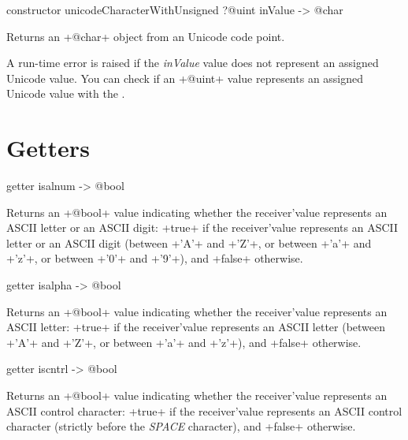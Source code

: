 
\begin{galgas}
constructor unicodeCharacterWithUnsigned ?@uint inValue -> @char
\end{galgas}


Returns an \ggs+@char+ object from an Unicode code point.

A run-time error is raised if the \emph{inValue} value does not represent an assigned Unicode value. You can check if an \ggs+@uint+ value represents an assigned Unicode value with the .


\section{Getters}



\begin{galgas}
getter isalnum -> @bool
\end{galgas}

Returns an \ggs+@bool+ value indicating whether the receiver'value represents an ASCII letter or an ASCII digit: \ggs+true+ if the receiver'value represents an ASCII letter or an ASCII digit (between \ggs+'A'+ and \ggs+'Z'+, or between \ggs+'a'+ and \ggs+'z'+, or between \ggs+'0'+ and \ggs+'9'+), and \ggs+false+ otherwise.





\begin{galgas}
getter isalpha -> @bool
\end{galgas}

Returns an \ggs+@bool+ value indicating whether the receiver'value represents an ASCII letter: \ggs+true+ if the receiver'value represents an ASCII letter (between \ggs+'A'+ and \ggs+'Z'+, or between \ggs+'a'+ and \ggs+'z'+), and \ggs+false+ otherwise.





\begin{galgas}
getter iscntrl -> @bool
\end{galgas}

Returns an \ggs+@bool+ value indicating whether the receiver'value represents an ASCII control character: \ggs+true+ if the receiver'value represents an ASCII control character (strictly before the \emph{SPACE} character), and \ggs+false+ otherwise.





